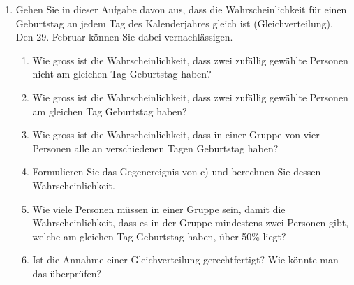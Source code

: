 \begin{ueb}
\begin{enumerate}
        \item Gehen Sie in dieser Aufgabe davon aus, dass die Wahrscheinlichkeit für einen Geburtstag an jedem Tag des Kalenderjahres gleich ist (Gleichverteilung). Den 29. Februar können Sie dabei vernachlässigen.
        \begin{enumerate}
            \item Wie gross ist die Wahrscheinlichkeit, dass zwei zufällig gewählte Personen nicht am gleichen Tag Geburtstag haben?
            \item Wie gross ist die Wahrscheinlichkeit, dass zwei zufällig gewählte Personen am gleichen Tag Geburtstag haben?
            \item Wie gross ist die Wahrscheinlichkeit, dass in einer Gruppe von vier Personen alle an verschiedenen Tagen Geburtstag haben?
            \item Formulieren Sie das Gegenereignis von c) und berechnen Sie dessen Wahrscheinlichkeit.
            \item Wie viele Personen müssen in einer Gruppe sein, damit die Wahrscheinlichkeit, dass es in der Gruppe mindestens zwei Personen gibt, welche am gleichen Tag Geburtstag haben, über 50\% liegt? 
            \item Ist die Annahme einer Gleichverteilung gerechtfertigt? Wie könnte man das überprüfen?
        \end{enumerate}
    
    \end{enumerate}
\end{ueb}


